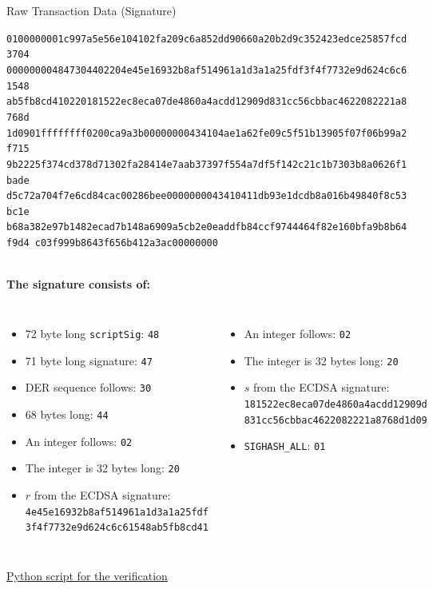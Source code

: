 \documentclass[handout]{beamer}
\begin{document}
\begin{frame}{Raw Transaction Data (Signature)}
	\begin{scriptsize}
\texttt{\textcolor{black!30}{0100000001c997a5e56e104102fa209c6a852dd90660a20b2d9c352423edce25857fcd3704
00000000}{\alert<2>{48}\alert<3>{47}\alert<4>{30}\alert<5>{44}\alert<6>{02}\alert<7>{20}\alert<8>{4e45e16932b8af514961a1d3a1a25fdf3f4f7732e9d624c6c61548
ab5fb8cd41}\alert<9>{02}\alert<10>{20}\alert<11>{181522ec8eca07de4860a4acdd12909d831cc56cbbac4622082221a8768d
1d09}\alert<12>{01}}\textcolor{black!30}{ffffffff0200ca9a3b00000000434104ae1a62fe09c5f51b13905f07f06b99a2f715
9b2225f374cd378d71302fa28414e7aab37397f554a7df5f142c21c1b7303b8a0626f1bade
d5c72a704f7e6cd84cac00286bee0000000043410411db93e1dcdb8a016b49840f8c53bc1e
b68a382e97b1482ecad7b148a6909a5cb2e0eaddfb84ccf9744464f82e160bfa9b8b64f9d4
c03f999b8643f656b412a3ac00000000}}
\end{scriptsize}
\vspace{1em}
\scriptsize \\
\textbf{The signature consists of:}\\
\begin{columns}[T]
\begin{itemize}
	\item \alert<2>{72 byte long \texttt{scriptSig}: \texttt{48}}
	\item \alert<3>{71 byte long signature: \texttt{47}}
	\item \alert<4>{DER sequence follows: \texttt{30}}
	\item \alert<5>{68 bytes long: \texttt{44}}
	\item \alert<6>{An integer follows: \texttt{02}}
	\item \alert<7>{The integer is 32 bytes long: \texttt{20}}
	\item \alert<8>{$r$ from the ECDSA signature: 	\texttt{4e45e16932b8af514961a1d3a1a25fdf\\3f4f7732e9d624c6c61548ab5fb8cd41}}
\end{itemize}
\begin{itemize}
	\item \alert<9>{An integer follows: \texttt{02}}
	\item \alert<10>{The integer is 32 bytes long: \texttt{20}}
	\item \alert<11>{$s$ from the ECDSA signature: \texttt{181522ec8eca07de4860a4acdd12909d\\831cc56cbbac4622082221a8768d1d09}}
	\item \alert<12>{\texttt{SIGHASH\_ALL}: \texttt{01}}
\end{itemize}
\end{columns}
\vspace{1.5em}
\href{https://github.com/cifunibas/Bitcoin-Blockchain-Cryptoassets/blob/main/assets/scripts/satoshi_transaction.py}{\link Python script for the verification}
\end{frame}
\end{document}
